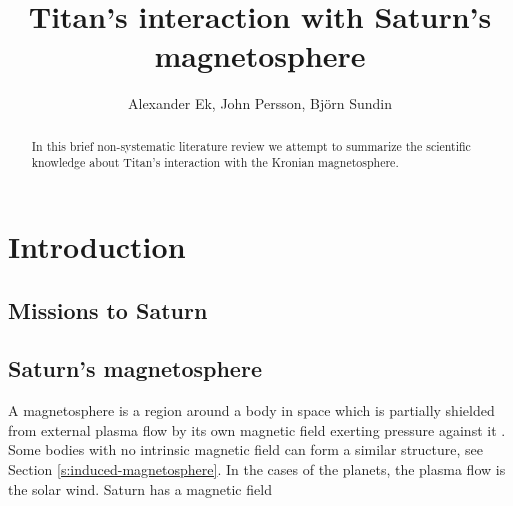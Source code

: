 \documentclass[12pt, parskip=full*, abstract]{scrartcl}
\title{Titan's interaction with Saturn's magnetosphere}
\author{Alexander Ek, John Persson, Björn Sundin}
\begin{document}
\maketitle
\vspace{5mm}
\begin{abstract}
	In this brief non-systematic literature review we attempt to summarize the scientific knowledge about Titan's interaction with the Kronian magnetosphere.
\end{abstract}

\newpage
\tableofcontents
\newpage

\section{Introduction}
\subsection{Missions to Saturn}


\subsection{Saturn's magnetosphere}
A magnetosphere is a region around a body in space which is partially shielded from external plasma flow by its own magnetic field exerting pressure against it \parencite{encyclopedia-magnetospheres}. Some bodies with no intrinsic magnetic field can form a similar structure, see Section \ref{s:induced-magnetosphere}. In the cases of the planets, the plasma flow is the solar wind. Saturn has a magnetic field 
\end{document}
